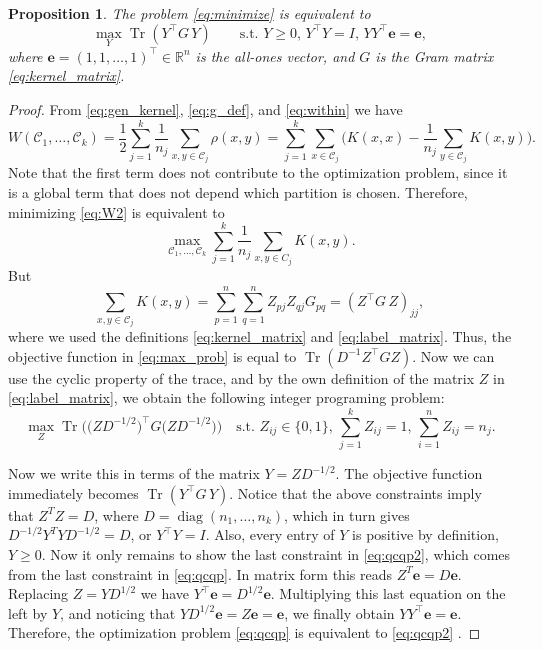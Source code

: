 \documentclass[aps,preprint,nofootinbib,floatfix]{revtex4-1}
\newtheorem{proposition}[theorem]{Proposition}
\DeclareMathOperator{\diag}{diag}
\DeclareMathOperator{\Tr}{Tr}
\newcommand\kk{K}
\newcommand\C{{\mathcal{C}}}
\newcommand\Zt{Y}
\begin{document}
\begin{proposition} 
\label{th:qcqp2}
The problem \eqref{eq:minimize} is equivalent to
\begin{equation}
\label{eq:qcqp2}
\max_{\Zt} \Tr \left( \Zt^\top G \, \Zt \right)  \qquad
\mbox{s.t. $\Zt \ge 0$, $\Zt^\top \Zt = I$, 
$\Zt \Zt^\top \bm{e} = \bm{e}$},
\end{equation}
where $\bm{e} = (1,1,\dots,1)^\top \in \mathbb{R}^n$ is the all-ones vector,
and $G$ is the Gram matrix \eqref{eq:kernel_matrix}.
\end{proposition}
\begin{proof}
From 
\eqref{eq:gen_kernel},
\eqref{eq:g_def}, and
\eqref{eq:within}
we have
\begin{equation}
\label{eq:W2}
W(\C_1,\dotsc,\C_k  )
= \dfrac{1}{2} \sum_{j=1}^k \dfrac{1}{n_j} \sum_{x,y \in \C_j} \rho(x,y)
= \sum_{j=1}^k \sum_{x \in \C_j}  \bigg(
\kk(x,x) - \dfrac{1}{n_j} \sum_{y \in \C_j} \kk(x,y) \bigg).
\end{equation}
Note that the first term does not contribute to the optimization problem,
since it is a global term that does not depend which partition is chosen. 
Therefore, minimizing \eqref{eq:W2} is equivalent to
\begin{equation}
\label{eq:max_prob}
\max_{ \C_1,\dotsc,\C_k } 
\sum_{j=1}^k \dfrac{1}{n_j} \sum_{x,y\in C_j} \kk(x,y) .
\end{equation}
But 
\begin{equation}
\sum_{x, y \in \C_j} \kk(x, y) =
\sum_{p=1}^{n} \sum_{q=1}^{n} Z_{pj} Z_{qj} G_{pq} = 
(Z^\top G \, Z)_{jj},
\end{equation}
where we used the definitions \eqref{eq:kernel_matrix} and
\eqref{eq:label_matrix}. Thus, the objective function in 
\eqref{eq:max_prob} is equal to
$\Tr \left( D^{-1} Z^\top G Z \right)$. Now we can
use the cyclic property
of the trace, and by the own definition of the matrix $Z$
in \eqref{eq:label_matrix}, we obtain the following integer
programing problem:
\begin{equation}\label{eq:qcqp}
\max_{Z} \Tr\Big( \big( Z D^{-1/2}\big)^\top G 
\big( ZD^{-1/2} \big) 
\Big) \quad
\mbox{s.t. $Z_{ij} \in \{0,1\}$, $\sum_{j=1}^k Z_{ij} = 1$, 
$\sum_{i=1}^n Z_{ij} = n_j$.}
\end{equation}

Now we write this in terms of the matrix $Y = Z D^{-1/2}$.
The objective function immediately becomes
$\Tr\left( Y^\top G \, Y\right)$. Notice that the above constraints
imply that $Z^T Z = D$, where $D=\diag(n_1,\dotsc,n_k)$, which in turn gives
$D^{-1/2} Y^T Y D^{-1/2} = D$, or $Y^\top Y = I$. 
Also, every entry of $Y$ is positive by definition,
$Y \ge 0$. Now it only remains to show the last 
constraint in \eqref{eq:qcqp2}, which comes from the last
constraint in \eqref{eq:qcqp}. In matrix form this reads
$Z^T \bm{e} = D \bm{e}$. Replacing $Z=YD^{1/2}$ we have
$Y^\top \bm{e} = D^{1/2} \bm{e}$. Multiplying this last equation
on the left by $Y$, and noticing
that $Y D^{1/2} \bm{e} = Z \bm{e} = \bm{e}$, we finally obtain
$Y Y^\top \bm{e} = \bm{e}$. Therefore, the optimization 
problem \eqref{eq:qcqp} is equivalent
to \eqref{eq:qcqp2} .
\end{proof}
\end{document}
